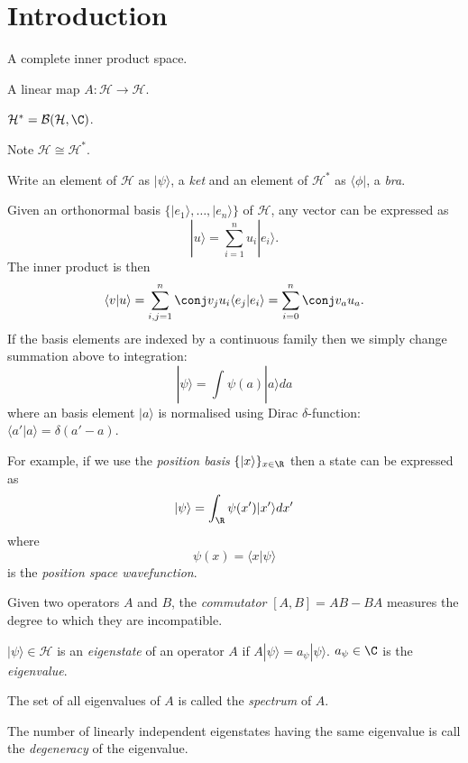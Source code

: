 \documentclass[a4paper]{article}
\renewcommand*{\H}{\mathcal{H}}
\theoremstyle{definition}
\begin{document}


\section{Introduction}

\begin{definition}
  A complete inner product space.
\end{definition}

\begin{definition}
  A linear map \(A: \H\to \H\).
\end{definition}

\begin{definition}
  \(\H^* = \mathcal{B}(\H,\C)\).
\end{definition}

Note \(\H \cong \H^*\).

\begin{notation}
  Write an element of \(\H\) as \(|\psi\rangle\), a \emph{ket} and an element of \(\H^*\) as \(\langle \phi|\), a \emph{bra}.
\end{notation}

Given an orthonormal basis \(\{|e_1\rangle,\dots,|e_n\rangle\}\) of \(\H\), any vector can be expressed as
\[
  |u\rangle = \sum_{i=1}^{n}u_i|e_i\rangle.
\]
The inner product is then
\[
  \langle v| u\rangle = \sum_{i,j=1}^{n}\conj v_j u_i \langle e_j|e_i\rangle = \sum_{i=0}^{n}\conj v_a u_a.
\]
If the basis elements are indexed by a continuous family then we simply change summation above to integration:
\[
  |\psi\rangle = \int_{ }^{ } \psi(a) |a\rangle da 
\]
where an basis element \(|a\rangle\) is normalised using Dirac \(\delta\)-function: \(\langle a'|a\rangle = \delta(a'-a)\).

For example, if we use the \emph{position basis} \(\{|x\rangle\}_{x\in\R}\) then a state can be expressed as
\[
  |\psi\rangle = \int_{\R}^{ } \psi(x')|x'\rangle dx'
\]
where
\[
  \psi(x) = \langle x| \psi\rangle 
\]
is the \emph{position space wavefunction}.

\begin{definition}[Commutator]
  Given two operators \(A\) and \(B\), the \emph{commutator} \([A,B] = AB- BA\) measures the degree to which they are incompatible.
\end{definition}

\begin{definition}
  \(|\psi\rangle \in \H\) is an \emph{eigenstate} of an operator \(A\) if \(A|\psi\rangle = a_\psi|\psi\rangle\). \(a_\psi\in\C\) is the \emph{eigenvalue}.

  The set of all eigenvalues of \(A\) is called the \emph{spectrum} of \(A\).

  The number of linearly independent eigenstates having the same eigenvalue is call the \emph{degeneracy} of the eigenvalue.
\end{definition}
\end{document}
